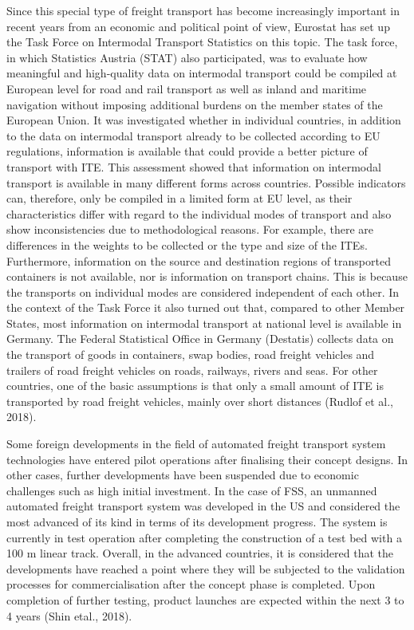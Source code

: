 \documentclass[
]{book}
\begin{document}
Since this special type of freight transport has become increasingly important in recent years from an economic and political point of view, Eurostat has set up the Task Force on Intermodal Transport Statistics on this topic. The task force, in which Statistics Austria (STAT) also participated, was to evaluate how meaningful and high-quality data on intermodal transport could be compiled at European level for road and rail transport as well as inland and maritime navigation without imposing additional burdens on the member states of the European Union. It was investigated whether in individual countries, in addition to the data on intermodal transport already to be collected according to EU regulations, information is available that could provide a better picture of transport with ITE. This assessment showed that information on intermodal transport is available in many different forms across countries. Possible indicators can, therefore, only be compiled in a limited form at EU level, as their characteristics differ with regard to the individual modes of transport and also show inconsistencies due to methodological reasons. For example, there are differences in the weights to be collected or the type and size of the ITEs. Furthermore, information on the source and destination regions of transported containers is not available, nor is information on transport chains. This is because the transports on individual modes are considered independent of each other. In the context of the Task Force it also turned out that, compared to other Member States, most information on intermodal transport at national level is available in Germany. The Federal Statistical Office in Germany (Destatis) collects data on the transport of goods in containers, swap bodies, road freight vehicles and trailers of road freight vehicles on roads, railways, rivers and seas. For other countries, one of the basic assumptions is that only a small amount of ITE is transported by road freight vehicles, mainly over short distances (Rudlof et al., 2018).

Some foreign developments in the field of automated freight transport system technologies have entered pilot operations after finalising their concept designs. In other cases, further developments have been suspended due to economic challenges such as high initial investment. In the case of FSS, an unmanned automated freight transport system was developed in the US and considered the most advanced of its kind in terms of its development progress. The system is currently in test operation after completing the construction of a test bed with a 100 m linear track. Overall, in the advanced countries, it is considered that the developments have reached a point where they will be subjected to the validation processes for commercialisation after the concept phase is completed. Upon completion of further testing, product launches are expected within the next 3 to 4 years (Shin etal., 2018).
\end{document}
